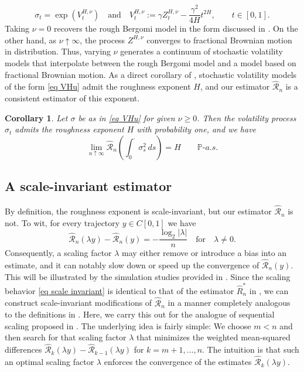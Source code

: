 \documentclass[12pt,reqno]{article}
\def\ua{\uparrow}
\def\wh{\widehat}
\numberwithin{equation}{section}
\def\cR{{\mathscr R}}
\newtheorem{corollary}[theorem]{Corollary}
\theoremstyle{definition}
\def\ua{\uparrow}
\def\wh{\widehat}
\newcommand{\bP}{\mathbb{P}}
\begin{document}
\begin{equation}\label{eq VHu}
	\sigma_t = \exp(V^{H,\nu}_t) \quad \text{and} \quad V^{H,\nu}_t := \gamma Z^{H,\nu}_t - \frac{\gamma^2}{4H}t^{2H}, \qquad  t \in [0,1].
\end{equation}
Taking $\nu = 0$ recovers the rough Bergomi model in the form discussed in \cite[Equation (28)]{Forde2022}. On the other hand, as $\nu \ua \infty$, the process $Z^{H,\nu}$ converges to fractional Brownian motion  in distribution. Thus, varying $\nu$ generates a continuum of stochastic volatility models that interpolate between the rough Bergomi model and a model based on fractional Brownian motion. As a direct corollary of , stochastic volatility models of the form \eqref{eq VHu} admit the roughness exponent $H$, and our estimator $\wh \cR_n$ is a consistent estimator of this exponent.
\begin{corollary}\label{Cor Rough Bergomi}
	Let $\sigma$ be as in \eqref{eq VHu} for given $\nu \ge 0$. Then the volatility process $\sigma_t$ admits the roughness exponent $H$ with probability one, and we have 
	\begin{equation}
		\lim_{n \ua \infty} \wh \cR_n \left(\int_{0}^{\cdot}\sigma_s^2 \,ds\right) = H \qquad \bP\text{-}a.s.
	\end{equation}
\end{corollary}




		
\subsection{A scale-invariant estimator}\label{scale-invariant section}


By definition, the roughness exponent is scale-invariant, but our estimator $\wh \cR_n$ is not. To wit,  for every trajectory $y\in C[0,1]$ we have
\begin{equation}\label{eq scale invariant}
	\wh\cR_n(\lambda y) - \wh\cR_n(y) = -\frac{\log_2 |\lambda|}{n} \quad \text{for} \quad \lambda \neq 0.
\end{equation}
Consequently, a scaling factor $\lambda$ may either remove or introduce a bias into an estimate, and it can notably slow down or speed up the convergence of $\wh\cR_n(y)$. This will be illustrated by the simulation studies provided in . Since the scaling behavior \eqref{eq scale invariant} is identical to that of the estimator $\wh R^\ast_n$ in \cite{HanSchiedHurst}, we can construct scale-invariant modifications of $\wh\cR_n$ in a manner completely analogous to the definitions in \cite[Section 8]{HanSchiedHurst}. 
Here, we carry this out for the analogue of sequential scaling proposed in \cite[Definition 8.1]{HanSchiedHurst}. The underlying idea is fairly simple: We choose $m<n$ and then search for that scaling factor $\lambda$ that minimizes  the weighted mean-squared differences $\wh\cR_k(\lambda y) - \wh\cR_{k-1}({\lambda y})$ for $k = m+1,\dots,n$. The intuition is that such an optimal scaling factor $\lambda$ enforces the convergence of the estimates $\wh\cR_k(\lambda y)$.
\end{document}
